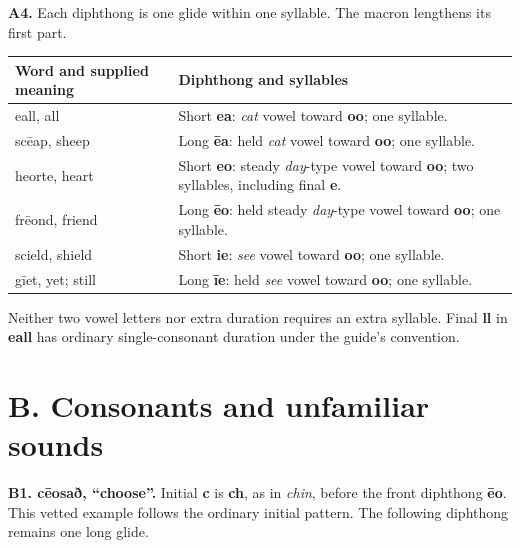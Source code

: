 \textbf{A4.} Each diphthong is one glide within one syllable. The macron lengthens its first part.

\par\begingroup
\fontsize{10.5}{13.2}\selectfont
\setlength{\LTleft}{0pt}\setlength{\LTright}{\fill}
\noindent
\begin{tabular}{@{}>{\raggedright\arraybackslash}p{34.265mm}>{\raggedright\arraybackslash}p{86.923mm}@{}}
\toprule
\textbf{Word and supplied meaning} & \textbf{Diphthong and syllables} \\
\midrule
eall, all & Short \textbf{ea}: \emph{cat} vowel toward \textbf{oo}; one syllable. \\
scēap, sheep & Long \textbf{ēa}: held \emph{cat} vowel toward \textbf{oo}; one syllable. \\
heorte, heart & Short \textbf{eo}: steady \emph{day}-type vowel toward \textbf{oo}; two syllables, including final \textbf{e}. \\
frēond, friend & Long \textbf{ēo}: held steady \emph{day}-type vowel toward \textbf{oo}; one syllable. \\
scield, shield & Short \textbf{ie}: \emph{see} vowel toward \textbf{oo}; one syllable. \\
gīet, yet; still & Long \textbf{īe}: held \emph{see} vowel toward \textbf{oo}; one syllable. \\
\bottomrule
\end{tabular}
\par\endgroup

Neither two vowel letters nor extra duration requires an extra syllable. Final \textbf{ll} in \textbf{eall} has ordinary single-consonant duration under the guide's convention.

\section*{B. Consonants and unfamiliar sounds}

\textbf{B1. cēosað, “choose”.} Initial \textbf{c} is \textbf{ch}, as in \emph{chin}, before the front diphthong \textbf{ēo}. This vetted example follows the ordinary initial pattern. The following diphthong remains one long glide.

